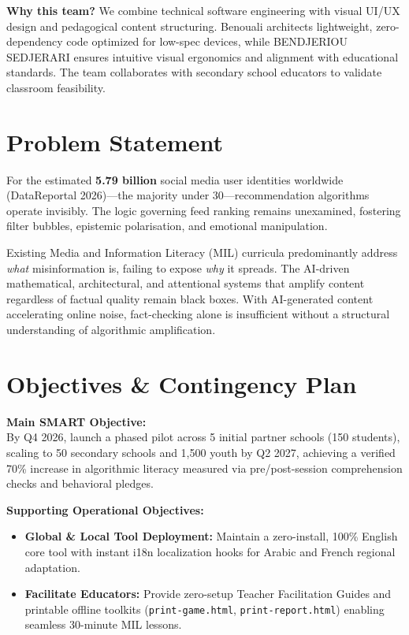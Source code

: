 \documentclass[11pt, a4paper]{article}
\begin{document}
\textbf{Why this team?} We combine technical software engineering with visual UI/UX design and pedagogical content structuring. Benouali architects lightweight, zero-dependency code optimized for low-spec devices, while BENDJERIOU SEDJERARI ensures intuitive visual ergonomics and alignment with educational standards. The team collaborates with secondary school educators to validate classroom feasibility.

\section{Problem Statement}

For the estimated \textbf{5.79 billion} social media user identities worldwide (DataReportal 2026)---the majority under 30---recommendation algorithms operate invisibly. The logic governing feed ranking remains unexamined, fostering filter bubbles, epistemic polarisation, and emotional manipulation.

Existing Media and Information Literacy (MIL) curricula predominantly address \emph{what} misinformation is, failing to expose \emph{why} it spreads. The AI-driven mathematical, architectural, and attentional systems that amplify content regardless of factual quality remain black boxes. With AI-generated content accelerating online noise, fact-checking alone is insufficient without a structural understanding of algorithmic amplification.

\section{Objectives \& Contingency Plan}

\textbf{Main SMART Objective:}\\
By Q4 2026, launch a phased pilot across 5 initial partner schools (150 students), scaling to 50 secondary schools and 1,500 youth by Q2 2027, achieving a verified 70\% increase in algorithmic literacy measured via pre/post-session comprehension checks and behavioral pledges.

\textbf{Supporting Operational Objectives:}
\begin{itemize}
    \item \textbf{Global \& Local Tool Deployment:} Maintain a zero-install, 100\% English core tool with instant i18n localization hooks for Arabic and French regional adaptation.
    \item \textbf{Facilitate Educators:} Provide zero-setup Teacher Facilitation Guides and printable offline toolkits (\texttt{print-game.html}, \texttt{print-report.html}) enabling seamless 30-minute MIL lessons.
\end{itemize}
\end{document}
